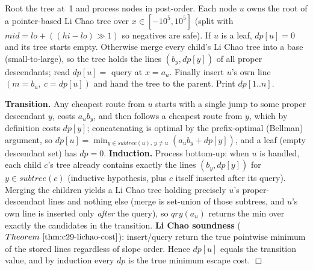 Root the tree at~1 and process nodes in post-order. Each node \(u\) owns the root of a pointer-based
Li Chao tree over \(x\in[-10^5,10^5]\) (split with \(\mathit{mid}=\mathit{lo}+((\mathit{hi}-\mathit{lo})\gg1)\)
so negatives are safe). If \(u\) is a leaf, \(\mathit{dp}[u]=0\) and its tree starts empty. Otherwise
merge every child's Li Chao tree into a base (small-to-large), so the tree holds the lines
\((b_y,\mathit{dp}[y])\) of all proper descendants; read \(\mathit{dp}[u]=\) query at \(x=a_u\). Finally
insert \(u\)'s own line \((m=b_u,\ c=\mathit{dp}[u])\) and hand the tree to the parent. Print
\(\mathit{dp}[1..n]\).

\begin{proofbox}
\textbf{Transition.} Any cheapest route from \(u\) starts with a single jump to some proper
descendant \(y\), costs \(a_u b_y\), and then follows a cheapest route from \(y\), which by definition
costs \(\mathit{dp}[y]\); concatenating is optimal by the prefix-optimal (Bellman) argument, so
\(\mathit{dp}[u]=\min_{y\in\mathit{subtree}(u),\,y\ne u}(a_u b_y+\mathit{dp}[y])\), and a leaf (empty
descendant set) has \(\mathit{dp}=0\). \textbf{Induction.} Process bottom-up: when \(u\) is handled,
each child \(c\)'s tree already contains exactly the lines \((b_y,\mathit{dp}[y])\) for \(y\in
\mathit{subtree}(c)\) (inductive hypothesis, plus \(c\) itself inserted after its query). Merging the
children yields a Li Chao tree holding precisely \(u\)'s proper-descendant lines and nothing else
(merge is set-union of those subtrees, and \(u\)'s own line is inserted only \emph{after} the query),
so \(\mathit{qry}(a_u)\) returns the min over exactly the candidates in the transition. \textbf{Li Chao
soundness} (\(\thmref{c29-lichao-cost}\)): insert/query return the true pointwise minimum of the stored
lines regardless of slope order. Hence \(\mathit{dp}[u]\) equals the transition value, and by induction
every \(\mathit{dp}\) is the true minimum escape cost. \(\Box\)
\end{proofbox}

